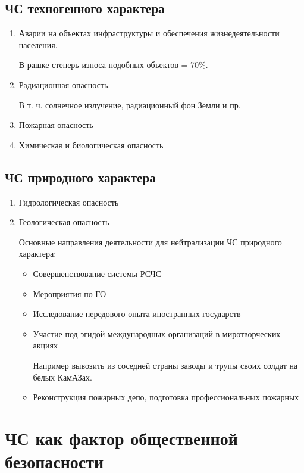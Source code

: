 \textsl{}\documentclass[oneside,final,14pt]{extreport}
\begin{document}
\subsection*{ЧС техногенного характера}
\begin{enumerate}
	\item Аварии на объектах инфраструктуры и обеспечения жизнедеятельности населения.
	
	В рашке степерь износа подобных объектов = 70\%.
	
	\item Радиационная опасность.
	
	В т. ч. солнечное излучение, радиационный фон Земли и пр.
	
	\item Пожарная опасность
	
	\item Химическая и биологическая опасность
\end{enumerate}

\subsection*{ЧС природного характера}
\begin{enumerate}
	\item Гидрологическая опасность
	\item Геологическая опасность
	
	Основные направления деятельности для нейтрализации ЧС природного характера:
	\begin{itemize}
		\item Совершенствование системы РСЧС
		\item Мероприятия по ГО
		\item Исследование передового опыта иностранных государств
		\item Участие под эгидой международных организаций в миротворческих акциях
		
		Например вывозить из соседней страны заводы и трупы своих солдат на белых КамАЗах.
		
		\item Реконструкция пожарных депо, подготовка профессиональных пожарных
	\end{itemize}
\end{enumerate}

\section*{ЧС как фактор общественной безопасности}
\end{document}
